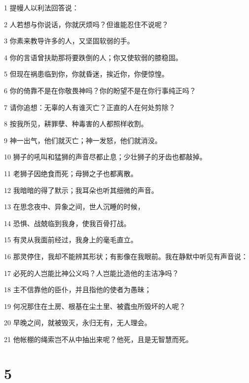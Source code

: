 \par 1 提幔人以利法回答说：
\par 2 人若想与你说话，你就厌烦吗？但谁能忍住不说呢？
\par 3 你素来教导许多的人，又坚固软弱的手。
\par 4 你的言语曾扶助那将要跌倒的人；你又使软弱的膝稳固。
\par 5 但现在祸患临到你，你就昏迷，挨近你，你便惊惶。
\par 6 你的倚靠不是在你敬畏神吗？你的盼望不是在你行事纯正吗？
\par 7 请你追想：无辜的人有谁灭亡？正直的人在何处剪除？
\par 8 按我所见，耕罪孽、种毒害的人都照样收割。
\par 9 神一出气，他们就灭亡；神一发怒，他们就消没。
\par 10 狮子的吼叫和猛狮的声音尽都止息；少壮狮子的牙齿也都敲掉。
\par 11 老狮子因绝食而死；母狮之子也都离散。
\par 12 我暗暗的得了默示；我耳朵也听其细微的声音。
\par 13 在思念夜中、异象之间，世人沉睡的时候，
\par 14 恐惧、战兢临到我身，使我百骨打战。
\par 15 有灵从我面前经过，我身上的毫毛直立。
\par 16 那灵停住，我却不能辨其形状；有影像在我眼前。我在静默中听见有声音说：
\par 17 必死的人岂能比神公义吗？人岂能比造他的主洁净吗？
\par 18 主不信靠他的臣仆，并且指他的使者为愚昧；
\par 19 何况那住在土房、根基在尘土里、被蠹虫所毁坏的人呢？
\par 20 早晚之间，就被毁灭，永归无有，无人理会。
\par 21 他帐棚的绳索岂不从中抽出来呢？他死，且是无智慧而死。

\chapter{5}

